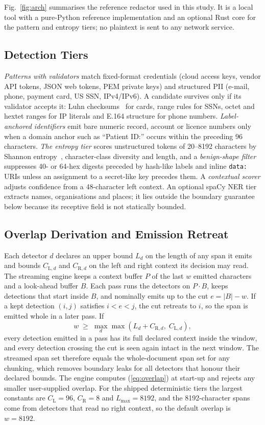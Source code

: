 \documentclass[conference]{IEEEtran}
\begin{document}
Fig.~\ref{fig:arch} summarises the reference redactor used in this study. It is
a local tool with a pure-Python reference implementation and an optional Rust
core for the pattern and entropy tiers; no plaintext is sent to any network
service.

\subsection{Detection Tiers}
\textit{Patterns with validators} match fixed-format credentials (cloud access
keys, vendor API tokens, JSON web tokens, PEM private keys) and structured PII
(e-mail, phone, payment card, US SSN, IPv4/IPv6). A candidate survives only if
its validator accepts it: Luhn checksums~\cite{luhn1960} for cards, range rules
for SSNs, octet and hextet ranges for IP literals and E.164 structure for
phone numbers. \textit{Label-anchored identifiers} emit bare numeric record,
account or licence numbers only when a domain anchor such as ``Patient ID:''
occurs within the preceding 96 characters. \textit{The entropy tier} scores
unstructured tokens of 20--8192 characters by Shannon entropy~\cite{shannon1948},
character-class diversity and length, and a \emph{benign-shape filter}
suppresses 40- or 64-hex digests preceded by hash-like labels and inline
\texttt{data:} URIs unless an assignment to a secret-like key precedes them.
A \textit{contextual scorer} adjusts confidence from a 48-character left
context. An optional spaCy NER tier extracts names, organisations and places;
it lies outside the boundary guarantee below because its receptive field is
not statically bounded.

\subsection{Overlap Derivation and Emission Retreat}
Each detector $d$ declares an upper bound $L_d$ on the length of any span it
emits and bounds $C_{\mathrm{L},d}$ and $C_{\mathrm{R},d}$ on the left and
right context its decision may read. The streaming engine keeps a context
buffer $P$ of the last $w$ emitted characters and a look-ahead buffer $B$. Each
pass runs the detectors on $P\cdot B$, keeps detections that start inside $B$,
and nominally emits up to the cut $e=|B|-w$. If a kept detection $(i,j)$
satisfies $i<e<j$, the cut retreats to $i$, so the span is emitted whole in a
later pass. If
\begin{equation}
w \;\ge\; \max_d \max\!\left(L_d + C_{\mathrm{R},d},\; C_{\mathrm{L},d}\right),
\label{eq:overlap}
\end{equation}
every detection emitted in a pass has its full declared context inside the
window, and every detection crossing the cut is seen again intact in the next
window. The streamed span set therefore equals the whole-document span set for
any chunking, which removes boundary leaks for all detectors that honour their
declared bounds. The engine computes (\ref{eq:overlap}) at start-up and rejects
any smaller user-supplied overlap. For the shipped deterministic tiers the
largest constants are $C_{\mathrm{L}}=96$, $C_{\mathrm{R}}=8$ and
$L_{\max}=8192$, and the 8192-character spans come from detectors that read no
right context, so the default overlap is $w=8192$.
\end{document}
